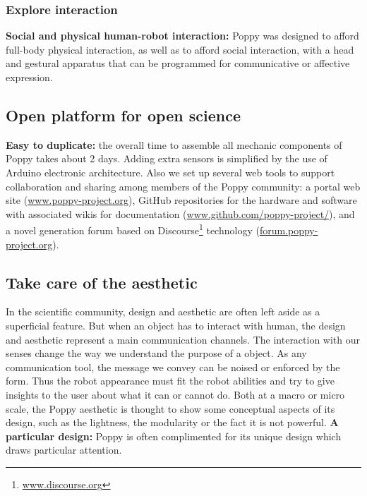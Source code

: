 \subsubsection{Explore interaction} %
\label{sub:explore_interaction}

\textbf{Social and physical human-robot interaction:} Poppy was designed to afford full-body physical interaction, as well as to afford social interaction, with a head and gestural apparatus that can be programmed for communicative or affective expression.



\subsection{Open platform for open science} %
\label{sub:open_platform_for_open_science}

    \textbf{Easy to duplicate:} the overall time to assemble all mechanic components of Poppy takes about 2 days. Adding extra sensors is simplified by the use of Arduino electronic architecture.
Also we set up several web tools to support collaboration and sharing among members of the Poppy community: a portal web site (\url{www.poppy-project.org}), GitHub repositories for the hardware and software with associated wikis for documentation (\url{www.github.com/poppy-project/}), and a novel generation forum based on Discourse\footnote{\url{www.discourse.org}} technology (\url{forum.poppy-project.org}).




\subsection{Take care of the aesthetic} %
In the scientific community, design and aesthetic are often left aside as a superficial feature. But when an object has to interact with human, the design and aesthetic represent a main communication channels. The interaction with our senses change the way we understand the purpose of a object. As any communication tool, the message we convey can be noised or enforced by the form. Thus the robot appearance must fit the robot abilities and try to give insights to the user about what it can or cannot do.
Both at a macro or micro scale, the Poppy aesthetic is thought to show some conceptual aspects of its design, such as the lightness, the modularity or the fact it is not powerful.
\textbf{A particular design:} Poppy is often complimented for its unique design which draws particular attention.

